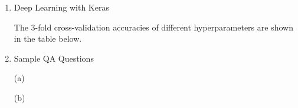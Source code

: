 \documentclass[11pt]{article}
\begin{document}
\begin{enumerate}
\item
Deep Learning with Keras

The 3-fold cross-validation accuracies of different hyperparameters are shown in the table below.

\item
Sample QA Questions

(a)


\medskip

(b)




\end{enumerate}
\end{document}
